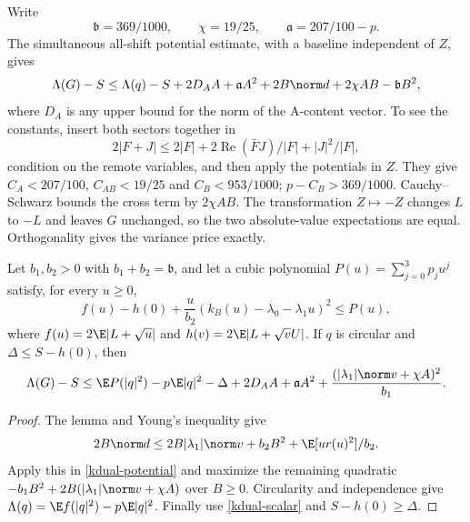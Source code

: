 Write
\[
\mathfrak b=369/1000,\qquad \chi=19/25,\qquad
\mathfrak a=207/100-p.
\]
The simultaneous all-shift potential estimate, with a baseline
independent of $Z$, gives
\begin{equation}\label{kdual-potential}
\Lambda(G)-S\le\Lambda(q)-S+2D_AA+\mathfrak a A^2
+2B\norm d+2\chi AB-\mathfrak b B^2,
\end{equation}
where $D_A$ is any upper bound for the norm of the A-content vector.
To see the constants, insert both sectors together in
\[
2|F+J|\le2|F|+2\operatorname{Re}(\bar FJ)/|F|+|J|^2/|F|,
\]
condition on the remote variables, and then apply the potentials in
$Z$. They give $C_A<207/100$, $C_{AB}<19/25$ and $C_B<953/1000$;
$p-C_B>369/1000$. Cauchy--Schwarz bounds the cross term by $2\chi AB$.
The transformation $Z\mapsto-Z$ changes $L$ to $-L$ and leaves $G$
unchanged, so the two absolute-value expectations are equal.
Orthogonality gives the variance price exactly.

\begin{proposition}\label{kdual-dual}
Let $b_1,b_2>0$ with $b_1+b_2=\mathfrak b$, and let a cubic polynomial
$P(u)=\sum_{j=0}^3p_ju^j$ satisfy, for every $u\ge0$,
\begin{equation}\label{kdual-scalar}
f(u)-h(0)+\frac{u}{b_2}(k_B(u)-\lambda_0-\lambda_1u)^2\le P(u),
\end{equation}
where $f(u)=2\E|L+\sqrt u|$ and $h(v)=2\E|L+\sqrt vU|$.
If $q$ is circular and $\Delta\le S-h(0)$, then
\begin{equation}\label{kdual-dualbound}
\Lambda(G)-S\le\E P(|q|^2)-p\E|q|^2-\Delta
+2D_AA+\mathfrak a A^2+
\frac{(|\lambda_1|\norm v+\chi A)^2}{b_1}.
\end{equation}
\end{proposition}
\begin{proof}
The lemma and Young's inequality give
\[
2B\norm d\le2B|\lambda_1|\norm v+b_2B^2+\E[u r(u)^2]/b_2.
\]
Apply this in \eqref{kdual-potential} and maximize the remaining quadratic
$-b_1B^2+2B(|\lambda_1|\norm v+\chi A)$ over $B\ge0$.
Circularity and independence give $\Lambda(q)=\E f(|q|^2)-p\E|q|^2$.
Finally use \eqref{kdual-scalar} and $S-h(0)\ge\Delta$.
\end{proof}

